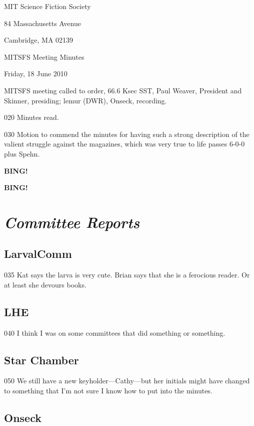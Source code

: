 \documentclass[10pt]{article}
\newcommand{\bing}{{\bf BING!} }
\newcommand{\goto}[1]{\bing \vskip 12pt \section*{{\em{#1}}}}
\newcommand{\ps}{ plus Spehn\xspace}
\newcommand{\skinner}{Paul Weaver, President and Skinner}
\newcommand{\onseck}{lemur (DWR), Onseck}
\newcommand{\meetingdate}{Friday, 18 June 2010}
\begin{document}
\begin{center}

MIT Science Fiction Society

84 Massachusetts Avenue

Cambridge, MA 02139

\vspace{12pt}

MITSFS Meeting Minutes

\meetingdate

\end{center}

\vspace{18pt}

\setlength{\parskip}{6pt}

 MITSFS meeting called to order, 66.6 Ksec SST,
\skinner, presiding; \onseck, recording.

020 Minutes read.

030 Motion to commend the minutes for having such a strong description
of the valient struggle against the magazines, which was very
true to life passes 6-0-0\ps.

\bing

\goto{Committee Reports}

\subsection*{LarvalComm}

035 Kat says the larva is very cute.  Brian says that she is a ferocious
reader.  Or at least she devours books.

\subsection*{LHE}

040 I think I was on some committees that did something or something.

\subsection*{Star Chamber}

050 We still have a new keyholder---Cathy---but her initials might have
changed to something that I'm not sure I know how to put into
the minutes.

\subsection*{Onseck}
\end{document}
